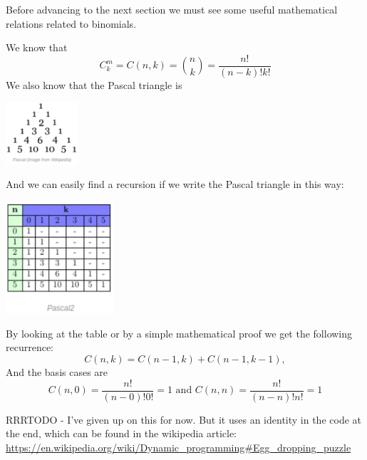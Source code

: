 
Before advancing to the next section we must see some useful mathematical
relations related to binomials.

We know that
\begin{equation*}
C^m_k=C(n,k)=\binom{n}{k}=\frac{n!}{(n-k)!k!}
\end{equation*}
We also know that the Pascal triangle is

\includegraphics[width=0.2\textwidth]{Images/figBrilliantEggDropPascalsTri}

And we can easily find a recursion if we write the Pascal triangle in this
way:

\includegraphics[width=0.3\textwidth]{Images/figBrilliantEggDropPascalsTri2}

By looking at the table or by a simple mathematical proof we get the
following recurrence:
\begin{equation*}
C(n,k)=C(n-1,k)+C(n-1,k-1),
\end{equation*}
And the basis cases are
\begin{equation*}
C(n,0)=\frac{n!}{(n-0)!0!}=1 \text{ and } C(n,n)=\frac{n!}{(n-n)!n!}=1
\end{equation*}


RRRTODO - I've given up on this for now. But it uses an identity in the code
at the end, which can be found in the wikipedia article:
\url{https://en.wikipedia.org/wiki/Dynamic\_programming#Egg\_dropping\_puzzle}


